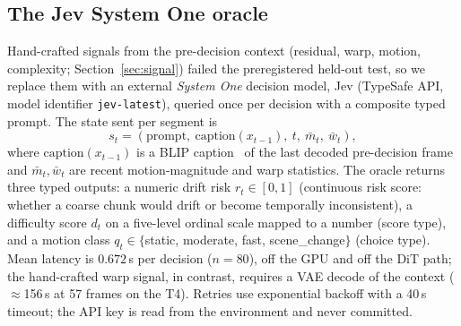 \documentclass[journal]{IEEEtran}
\begin{document}
\subsection{The Jev System One oracle}
\label{sec:jev}
Hand-crafted signals from the pre-decision context (residual, warp, motion, complexity; Section~\ref{sec:signal}) failed the preregistered held-out test, so we replace them with an external \emph{System One} decision model, Jev (TypeSafe API, model identifier \texttt{jev-latest}), queried once per decision with a composite typed prompt. The state sent per segment is
\begin{equation}
s_t = (\text{prompt},\ \text{caption}(x_{t-1}),\ t,\ \bar{m}_t,\ \bar{w}_t),
\end{equation}
where $\text{caption}(x_{t-1})$ is a BLIP caption~\cite{li2022blip} of the last decoded pre-decision frame and $\bar{m}_t,\bar{w}_t$ are recent motion-magnitude and warp statistics. The oracle returns three typed outputs: a numeric drift risk $r_t \in [0,1]$ (continuous risk score: whether a coarse chunk would drift or become temporally inconsistent), a difficulty score $d_t$ on a five-level ordinal scale mapped to a number (score type), and a motion class $q_t \in \{$static, moderate, fast, scene\_change$\}$ (choice type). Mean latency is $0.672$\,s per decision ($n{=}80$), off the GPU and off the DiT path; the hand-crafted warp signal, in contrast, requires a VAE decode of the context ($\approx$156\,s at 57 frames on the T4). Retries use exponential backoff with a 40\,s timeout; the API key is read from the environment and never committed.
\end{document}
